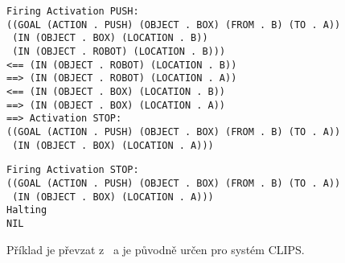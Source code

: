 \begin{verbatim}
Firing Activation PUSH:
((GOAL (ACTION . PUSH) (OBJECT . BOX) (FROM . B) (TO . A))
 (IN (OBJECT . BOX) (LOCATION . B))
 (IN (OBJECT . ROBOT) (LOCATION . B)))
<== (IN (OBJECT . ROBOT) (LOCATION . B))
==> (IN (OBJECT . ROBOT) (LOCATION . A))
<== (IN (OBJECT . BOX) (LOCATION . B))
==> (IN (OBJECT . BOX) (LOCATION . A))
==> Activation STOP:
((GOAL (ACTION . PUSH) (OBJECT . BOX) (FROM . B) (TO . A))
 (IN (OBJECT . BOX) (LOCATION . A)))
\end{verbatim}
\begin{verbatim}
Firing Activation STOP:
((GOAL (ACTION . PUSH) (OBJECT . BOX) (FROM . B) (TO . A))
 (IN (OBJECT . BOX) (LOCATION . A)))
Halting
NIL
\end{verbatim}
Příklad je převzat z~\cite{introduction} a je původně určen pro systém \textsf{CLIPS}.
